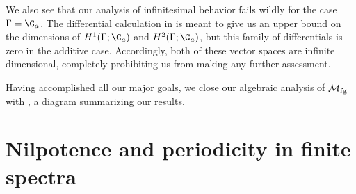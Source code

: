 \begin{remark}
We also see that our analysis of infinitesimal behavior fails wildly for the case \(\Gamma = \G_a\).  The differential calculation in  is meant to give us an upper bound on the dimensions of \(H^1(\Gamma; \G_a)\) and \(H^2(\Gamma; \G_a)\), but this family of differentials is zero in the additive case.  Accordingly, both of these vector spaces are infinite dimensional, completely prohibiting us from making any further assessment.
\end{remark}

Having accomplished all our major goals, we close our algebraic analysis of \(\mathcal{M}_{\mathbf{fg}}\) with , a diagram summarizing our results.










\section{Nilpotence and periodicity in finite spectra}\label{NilpotenceAndPeriodicity}

